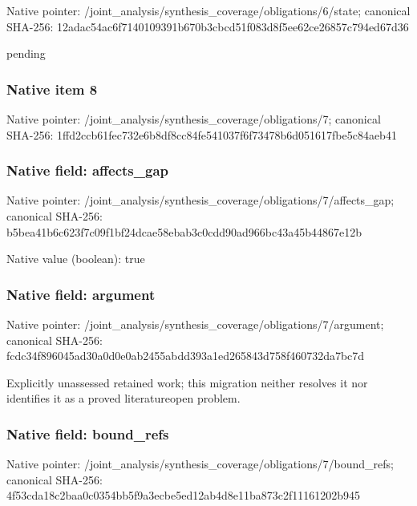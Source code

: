 \documentclass[10pt,a4paper]{article}
\begin{document}
Native pointer: /joint\_analysis/synthesi\allowbreak{}s\_coverage/obligations/6\allowbreak{}/state; canonical SHA-256: 12adac54ac6f7140109391b6\allowbreak{}70b3cbcd51f083d8f5ee62ce\allowbreak{}26857c794ed67d36


pending


\subsubsection{Native item 8}


Native pointer: /joint\_analysis/synthesi\allowbreak{}s\_coverage/obligations/7; canonical SHA-256: 1ffd2ccb61fec732e6b8df8c\allowbreak{}c84fe541037f6f73478b6d05\allowbreak{}1617fbe5c84aeb41



\subsubsection{Native field: affects\_gap}


Native pointer: /joint\_analysis/synthesi\allowbreak{}s\_coverage/obligations/7\allowbreak{}/affects\_gap; canonical SHA-256: b5bea41b6c623f7c09f1bf24\allowbreak{}dcae58ebab3c0cdd90ad966b\allowbreak{}c43a45b44867e12b



Native value (boolean): true



\subsubsection{Native field: argument}


Native pointer: /joint\_analysis/synthesi\allowbreak{}s\_coverage/obligations/7\allowbreak{}/argument; canonical SHA-256: fcdc34f896045ad30a0d0e0a\allowbreak{}b2455abdd393a1ed265843d7\allowbreak{}58f460732da7bc7d


Explicitly unassessed retained work; this migration neither resolves it nor identifies it as a proved literatureopen problem.


\subsubsection{Native field: bound\_refs}


Native pointer: /joint\_analysis/synthesi\allowbreak{}s\_coverage/obligations/7\allowbreak{}/bound\_refs; canonical SHA-256: 4f53cda18c2baa0c0354bb5f\allowbreak{}9a3ecbe5ed12ab4d8e11ba87\allowbreak{}3c2f11161202b945
\end{document}
